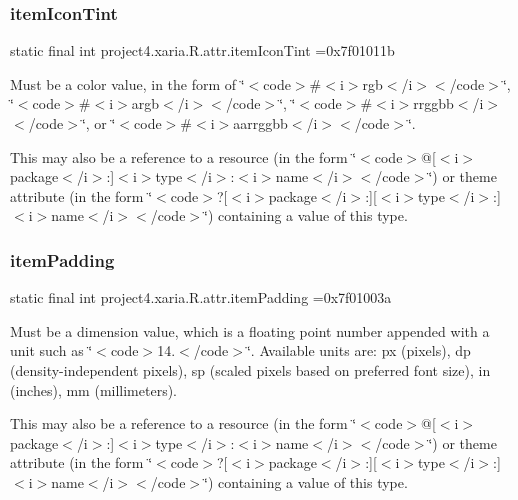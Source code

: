 \subsubsection{\texorpdfstring{item\+Icon\+Tint}{itemIconTint}}
{\footnotesize\ttfamily static final int project4.\+xaria.\+R.\+attr.\+item\+Icon\+Tint =0x7f01011b\hspace{0.3cm}{\ttfamily [static]}}

Must be a color value, in the form of \char`\"{}$<$code$>$\#$<$i$>$rgb$<$/i$>$$<$/code$>$\char`\"{}, \char`\"{}$<$code$>$\#$<$i$>$argb$<$/i$>$$<$/code$>$\char`\"{}, \char`\"{}$<$code$>$\#$<$i$>$rrggbb$<$/i$>$$<$/code$>$\char`\"{}, or \char`\"{}$<$code$>$\#$<$i$>$aarrggbb$<$/i$>$$<$/code$>$\char`\"{}. 

This may also be a reference to a resource (in the form \char`\"{}$<$code$>$@\mbox{[}$<$i$>$package$<$/i$>$\+:\mbox{]}$<$i$>$type$<$/i$>$\+:$<$i$>$name$<$/i$>$$<$/code$>$\char`\"{}) or theme attribute (in the form \char`\"{}$<$code$>$?\mbox{[}$<$i$>$package$<$/i$>$\+:\mbox{]}\mbox{[}$<$i$>$type$<$/i$>$\+:\mbox{]}$<$i$>$name$<$/i$>$$<$/code$>$\char`\"{}) containing a value of this type. \mbox{\label{classproject4_1_1xaria_1_1R_1_1attr_a622773948d03a10f34c229caeed7b5f8}} 
\subsubsection{\texorpdfstring{item\+Padding}{itemPadding}}
{\footnotesize\ttfamily static final int project4.\+xaria.\+R.\+attr.\+item\+Padding =0x7f01003a\hspace{0.3cm}{\ttfamily [static]}}

Must be a dimension value, which is a floating point number appended with a unit such as \char`\"{}$<$code$>$14.\+5sp$<$/code$>$\char`\"{}. Available units are\+: px (pixels), dp (density-\/independent pixels), sp (scaled pixels based on preferred font size), in (inches), mm (millimeters). 

This may also be a reference to a resource (in the form \char`\"{}$<$code$>$@\mbox{[}$<$i$>$package$<$/i$>$\+:\mbox{]}$<$i$>$type$<$/i$>$\+:$<$i$>$name$<$/i$>$$<$/code$>$\char`\"{}) or theme attribute (in the form \char`\"{}$<$code$>$?\mbox{[}$<$i$>$package$<$/i$>$\+:\mbox{]}\mbox{[}$<$i$>$type$<$/i$>$\+:\mbox{]}$<$i$>$name$<$/i$>$$<$/code$>$\char`\"{}) containing a value of this type. \mbox{\label{classproject4_1_1xaria_1_1R_1_1attr_a0ec6e8e1767b6753de3c7040f188d0d5}} 
